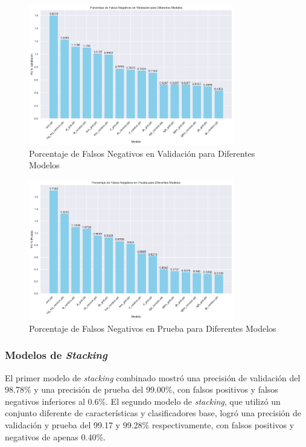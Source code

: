 \begin{figure}[H]
    \centering
    \includegraphics[width=0.8\textwidth]{negativosValidacion.png}
    \caption{Porcentaje de Falsos Negativos en Validación para Diferentes Modelos}
    \label{fig:fn_validacion}
\end{figure}

\begin{figure}[H]
    \centering
    \includegraphics[width=0.8\textwidth]{negativosPrueba.png}
    \caption{Porcentaje de Falsos Negativos en Prueba para Diferentes Modelos}
    \label{fig:fn_prueba}
\end{figure}

\subsubsection*{Modelos de \textit{Stacking}}

El primer modelo de \textit{stacking} combinado mostró una precisión de validación del 98.78\% y una precisión de prueba del 99.00\%, con falsos positivos y falsos negativos inferiores al 0.6\%. El segundo modelo de \textit{stacking}, que utilizó un conjunto diferente de características y clasificadores base, logró una precisión de validación y prueba del 99.17 y 99.28\% respectivamente, con falsos positivos y negativos de apenas 0.40\%.

